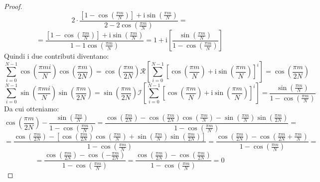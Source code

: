 \begin{proposizione}
\begin{proof}
\begin{equation*}
            2 \cdot \frac{\left[1 - \cos\left(\frac{\pi m}{N}\right)\right] + \text{i} \sin\left(\frac{\pi m}{N}\right)}{2 - 2\cos\left(\frac{\pi m}{N}\right)} =
        \end{equation*}
        \begin{equation*}
            = \frac{\left[1 - \cos\left(\frac{\pi m}{N}\right)\right] + \text{i} \sin\left(\frac{\pi m}{N}\right)}{1 - 1\cos\left(\frac{\pi m}{N}\right)} =
            1 + \text{i} \left[\frac{\sin\left(\frac{\pi m}{N}\right)}{1 - \cos \left(\frac{\pi m}{N}\right)}\right]
        \end{equation*}
        Quindi i due contributi diventano:
        \begin{equation*}
            \sum_{i=0}^{N-1} \cos\left(\frac{\pi mi}{N}\right)\cos\left(\frac{\pi m}{2N}\right) =
            \cos\left(\frac{\pi m}{2N}\right) \mathcal{R} \left[\sum_{i = 0}^{N - 1}\left[ \cos\left(\frac{\pi m}{N}\right) + \text{i} \sin\left(\frac{\pi m}{N}\right)\right]^i\right]
            = \cos\left(\frac{\pi m}{2N}\right)
        \end{equation*}
        \begin{equation*}
            \sum_{i=0}^{N-1} \sin\left(\frac{\pi mi}{N}\right)\sin\left(\frac{\pi m}{2N}\right) =
            \sin\left(\frac{\pi m}{2N}\right) \mathcal{I} \left[\sum_{i = 0}^{N - 1} \left[\cos\left(\frac{\pi m}{N}\right) + \text{i} \sin\left(\frac{\pi m}{N}\right)\right]^i\right]
            = \frac{\sin\left(\frac{\pi m}{N}\right)}{1 - \cos \left(\frac{\pi m}{N}\right)}
        \end{equation*}
        Da cui otteniamo:
        \begin{equation*}
            \cos\left(\frac{\pi m}{2N}\right) - \frac{\sin\left(\frac{\pi m}{N}\right)}{1 - \cos \left(\frac{\pi m}{N}\right)} =
            \frac{\cos\left(\frac{\pi m}{2N}\right) - \cos\left(\frac{\pi m}{2N}\right) \cos \left(\frac{\pi m}{N}\right) - \sin\left(\frac{\pi m}{N}\right)\sin\left(\frac{\pi m}{2N}\right)}{1 - \cos \left(\frac{\pi m}{N}\right)} =
        \end{equation*}
        \begin{equation*}
            = \frac{\cos\left(\frac{\pi m}{2N}\right) - \left[\cos\left(\frac{\pi m}{2N}\right) \cos \left(\frac{\pi m}{N}\right) + \sin\left(\frac{\pi m}{N}\right)\sin\left(\frac{\pi m}{2N}\right)\right]}{1 - \cos \left(\frac{\pi m}{N}\right)} =
            \frac{\cos\left(\frac{\pi m}{2N}\right) - \cos\left(\frac{\pi m}{2N} + \frac{\pi m}{N}\right)}{1 - \cos \left(\frac{\pi m}{N}\right)} =
        \end{equation*}
        \begin{equation*}
            = \frac{\cos\left(\frac{\pi m}{2N}\right) - \cos\left(- \frac{\pi m}{2N}\right)}{1 - \cos \left(\frac{\pi m}{N}\right)}
            = \frac{\cos\left(\frac{\pi m}{2N}\right) - \cos\left(\frac{\pi m}{2N}\right)}{1 - \cos \left(\frac{\pi m}{N}\right)} = 0
        \end{equation*}
    \end{proof}
\end{proposizione}


